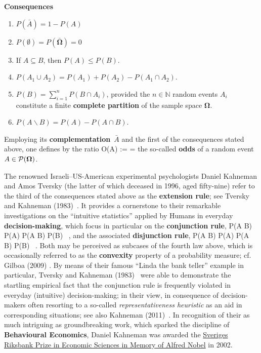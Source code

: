 \medskip
\noindent
\textbf{Consequences}
%
\begin{enumerate}

\item $P(\bar{A}) = 1-P(A)$

\item $P(\emptyset) = P(\bar{\boldsymbol{\Omega}}) = 0$

\item If $A \subseteq B$, then $P(A) \leq P(B)$.

\item $P(A_{1} \cup A_{2}) = P(A_{1})+P(A_{2})-P(A_{1} \cap 
A_{2})$.

\item $\displaystyle P(B) = \sum_{i=1}^{n}P(B \cap A_{i})$,
provided the $n \in \mathbb{N}$ random events $A_{i}$ constitute a 
finite \textbf{complete partition} of the sample space 
$\boldsymbol{\Omega}$.

\item $P(A\backslash B) = P(A) - P(A \cap B)$.

\end{enumerate}
%

\vspace{5mm}
\noindent
Employing its \textbf{complementation}~$\bar{A}$ and the first of
the consequences stated above, one defines by the ratio
%
\be
{}
O(A) :=  = 
\ee
%
the so-called \textbf{odds} of a random event
$A \in {\cal P}(\boldsymbol{\Omega})$.

\medskip
\noindent
The renowned Israeli--US-American experimental psychologists 
Daniel Kahneman and Amos Tversky (the latter of which deceased in 
1996, aged fifty-nine) refer to the third of the consequences
stated above as the \textbf{extension rule}; see Tversky and
Kahneman (1983)~. It provides a cornerstone
to their remarkable investigations on the ``intuitive statistics''
applied by Humans in everyday \textbf{decision-making}, which focus
in particular on the \textbf{conjunction rule},
%
\be
{}
P(A \cap B) \leq P(A)
\quad{}\quad
P(A \cap B) \leq P(B) \ ,
\ee
%
and the associated \textbf{disjunction rule},
%
\be
{}
P(A \cup B) \geq P(A)
\quad{}\quad
P(A \cup B) \geq P(B) \ .
\ee
%
Both may be perceived as subcases of the fourth law above, which 
is occasionally referred to as the \textbf{convexity} property of a 
probability measure; cf. Gilboa (2009) . By 
means of their famous ``Linda the bank teller'' example in 
particular, Tversky and Kahneman (1983)~ 
were able to demonstrate the startling empirical fact that the 
conjunction rule is frequently violated in everyday (intuitive)
decision-making; in their view, in consequence of decision-makers 
often resorting to a so-called \textit{representativeness
heuristic} as an aid in corresponding situations; see also Kahneman
(2011)~. In recognition of their as much
intriguing as groundbreaking work, which sparked the discipline of
\textbf{Behavioural Economics}, Daniel Kahneman was awarded the  
\href{http://www.nobelprize.org/nobel_prizes/economics/laureates/2002/}{Sveriges
Riksbank Prize in Economic Sciences in Memory of Alfred Nobel}
in 2002.

